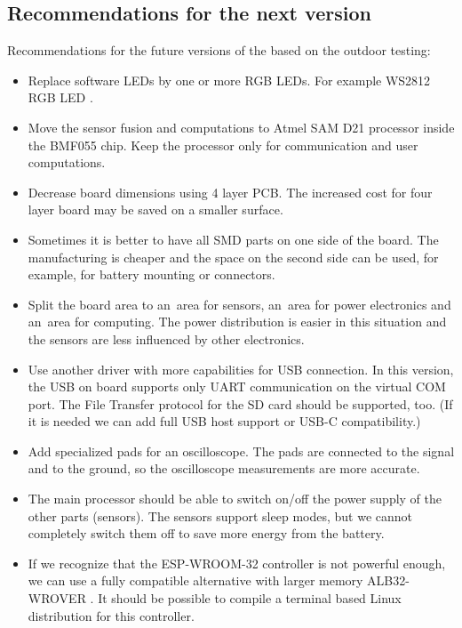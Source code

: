 \subsection{Recommendations for the next version}
\label{recommendationsNextVerison}
Recommendations for the future versions of the  based on the outdoor testing:
\begin{itemize}
    \item Replace software LEDs by one or more RGB LEDs. For example WS2812 RGB LED \cite{worldsemi:WS2812}.
    \item Move the sensor fusion and computations to Atmel SAM D21 \cite{atmel:samd20} processor inside the BMF055 \cite{bosch:BMF055} chip. Keep the  \cite{espressif:ESP-WROOM-32} processor only for communication and user computations.
    \item Decrease board dimensions using 4 layer \ac{PCB}. The increased cost for four layer board may be saved on a smaller surface.
    \item Sometimes it is better to have all \ac{SMD} parts on one side of the board. The manufacturing is cheaper and the space on the second side can be used, for example, for battery mounting or connectors.
    \item Split the board area to an~area for sensors, an~area for power electronics and an~area for computing. The power distribution is easier in this situation and the sensors are less influenced by other electronics.
    \item Use another driver with more capabilities for USB connection. In this version, the USB on board supports only UART communication on the virtual COM port. The File Transfer protocol for the SD card should be supported, too. (If it is needed we can add full USB host support or USB-C compatibility.)
    \item Add specialized pads for an oscilloscope. The pads are connected to the signal and to the ground, so the oscilloscope measurements are more accurate.
    \item The main processor should be able to switch on/off the power supply of the other parts (sensors). The sensors support sleep modes, but we cannot completely switch them off to save more energy from the battery.
    \item If we recognize that the ESP-WROOM-32 controller is not powerful enough, we can use a fully compatible alternative with larger memory ALB32-WROVER \cite{ALB32-WROVER}. It should be possible to compile a terminal based Linux distribution for this controller.
\end{itemize}

